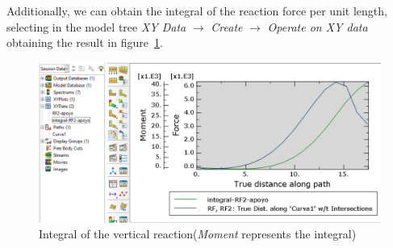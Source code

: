 \documentclass[english,a4paper,12pt]{article}
\begin{document}
Additionally, we can obtain the integral of the reaction force per unit length, selecting in the model tree
\emph{XY Data} $\to$ \emph{Create} $\to$ \emph{Operate on XY data} obtaining the result in figure~\ref{fig:int-reac-vert}.
\begin{figure}[!htbp]
\centering
\includegraphics[scale=0.45]{capturas2019/a_fig42p.png}
\caption{Integral of the vertical reaction(\emph{Moment} represents the integral)}
\label{fig:int-reac-vert}
\end{figure}
\clearpage
\end{document}
